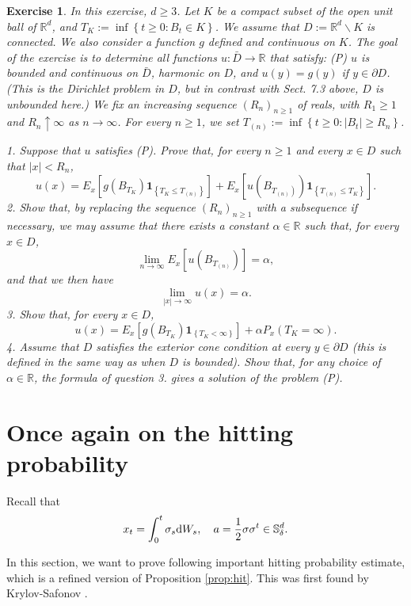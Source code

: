\documentclass[twoside, 12pt]{book}
\numberwithin{equation}{chapter}
\newtheorem{exercise}{Exercise}[section]
\def\mS{{\mathbb S}}
\def\geq{\geqslant}
\def\leq{\leqslant}
\def\d{\text{\rm{d}}}
\begin{document}
	\begin{exercise}
		In this exercise, $d \geq 3$. Let $K$ be a compact subset of the open unit ball of $\mathbb{R}^d$, and $T_K:=\inf \left\{t \geq 0: B_t \in K\right\}$. We assume that $D:=\mathbb{R}^d \backslash K$ is connected. We also consider a function $g$ defined and continuous on $K$. The goal of the exercise is to determine all functions $u: \bar{D} \rightarrow \mathbb{R}$ that satisfy:
		(P) $u$ is bounded and continuous on $\bar{D}$, harmonic on $D$, and $u(y)=g(y)$ if $y \in \partial D$.
		(This is the Dirichlet problem in $D$, but in contrast with Sect. 7.3 above, $D$ is unbounded here.) We fix an increasing sequence $\left(R_n\right)_{n \geq 1}$ of reals, with $R_1 \geq 1$ and $R_n \uparrow \infty$ as $n \rightarrow \infty$. For every $n \geq 1$, we set $T_{(n)}:=\inf \left\{t \geq 0:\left|B_t\right| \geq R_n\right\}$.
		
		1. Suppose that $u$ satisfies (P). Prove that, for every $n \geq 1$ and every $x \in D$ such that $|x|<R_n$,
		$$
		u(x)=E_x\left[g\left(B_{T_K}\right) \mathbf{1}_{\left\{T_K \leq T_{(n)}\right\}}\right]+E_x\left[u\left(B_{\left.T_{(n)}\right)}\right) \mathbf{1}_{\left\{T_{(n)} \leq T_K\right\}}\right] .
		$$
		2. Show that, by replacing the sequence $\left(R_n\right)_{n \geq 1}$ with a subsequence if necessary, we may assume that there exists a constant $\alpha \in \mathbb{R}$ such that, for every $x \in D$,
		$$
		\lim _{n \rightarrow \infty} E_x\left[u\left(B_{T_{(n)}}\right)\right]=\alpha,
		$$
		and that we then have
		$$
		\lim _{|x| \rightarrow \infty} u(x)=\alpha .
		$$
		3. Show that, for every $x \in D$,
		$$
		u(x)=E_x\left[g\left(B_{T_K}\right) \mathbf{1}_{\left\{T_K<\infty\right\}}\right]+\alpha P_x\left(T_K=\infty\right) .
		$$
		4. Assume that $D$ satisfies the exterior cone condition at every $y \in \partial D$ (this is defined in the same way as when $D$ is bounded). Show that, for any choice of $\alpha \in \mathbb{R}$, the formula of question 3. gives a solution of the problem (P).
	\end{exercise}
	
	
	\section{Once again on the hitting probability}
	Recall that 
	\[
	x_t=\int_0^t \sigma_s \d W_s, \quad a=\frac{1}{2}\sigma \sigma^t \in \mS^d_\delta. 
	\]
	
	In this section, we want to prove following important hitting probability estimate, which is a refined version of Proposition \ref{prop:hit}. This was first found by Krylov-Safonov \cite{krylov1979estimate}. 
	
\end{document}
